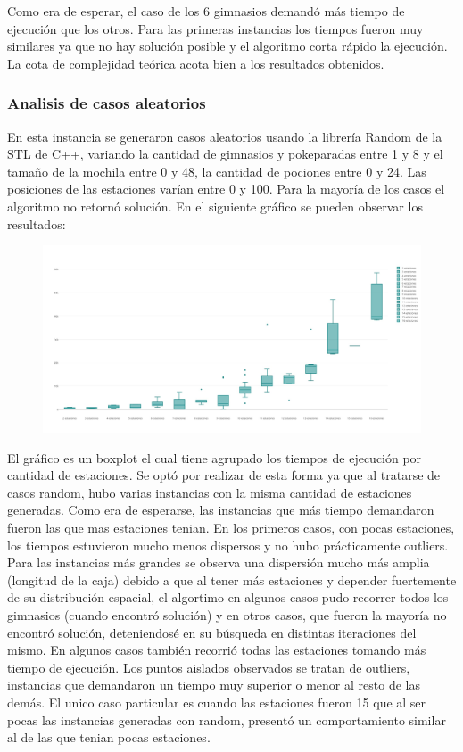       Como era de esperar, el caso de los 6 gimnasios demandó más tiempo de ejecución que los otros. Para las primeras instancias los tiempos fueron muy similares ya que no hay solución posible y el algoritmo corta rápido la ejecución. La cota de complejidad teórica acota bien a los resultados obtenidos.

      \subsubsection{Analisis de casos aleatorios}
      En esta instancia se generaron casos aleatorios usando la librería Random de la STL de C++, variando la cantidad de gimnasios y pokeparadas entre 1 y 8 y el tamaño de la mochila entre 0 y 48, la cantidad de pociones entre 0 y 24. Las posiciones de las estaciones varían entre 0 y 100. Para la mayoría de los casos el algoritmo no retornó solución.
      En el siguiente gráfico se pueden observar los resultados:

      \begin{figure}[H]
      \begin{center}
        \includegraphics[width=1.0\columnwidth]{imagenes/exp_random_ej2.jpeg}
        \caption{}
      \end{center}
  \end{figure}

     El gráfico es un boxplot el cual tiene agrupado los tiempos de ejecución por cantidad de estaciones. Se optó por realizar de esta forma ya que al tratarse de casos random, hubo varias instancias con la misma cantidad de estaciones generadas. Como era de esperarse, las instancias que más tiempo demandaron fueron las que mas estaciones tenian. En los primeros casos, con pocas estaciones, los tiempos estuvieron mucho menos dispersos y no hubo prácticamente outliers. Para las instancias más grandes se observa una dispersión mucho más amplia (longitud de la caja) debido a que al tener más estaciones y depender fuertemente de su distribución espacial, el algortimo en algunos casos pudo recorrer todos los gimnasios (cuando encontró solución) y en otros casos, que fueron la mayoría no encontró solución, deteniendosé en su búsqueda en distintas iteraciones del mismo. En algunos casos también recorrió todas las estaciones tomando más tiempo de ejecución. Los puntos aislados observados se tratan de outliers, instancias que demandaron un tiempo muy superior o menor al resto de las demás. El unico caso particular es cuando las estaciones fueron 15 que al ser pocas las instancias generadas con random, presentó un comportamiento similar al de las que tenian pocas estaciones.